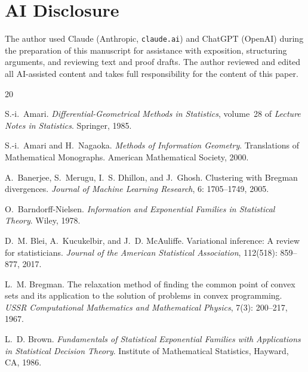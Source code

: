 \documentclass[11pt, a4paper, 
onecolumn, 
showabstract]{naverlabseurope-onecol-flex}
\theoremstyle{definition}
\theoremstyle{remark}
\begin{document}
\section*{AI Disclosure}

The author used Claude (Anthropic, \texttt{claude.ai}) and ChatGPT (OpenAI) during the preparation of this manuscript for assistance with exposition, structuring arguments, and reviewing text and proof drafts. The author reviewed and edited all AI-assisted content and takes full responsibility for the content of this paper.


\begin{thebibliography}{20}

S.-i.~Amari.
\emph{Differential-Geometrical Methods in Statistics}, volume~28 of \emph{Lecture Notes in Statistics}.
Springer, 1985.

S.-i.~Amari and H.~Nagaoka.
\emph{Methods of Information Geometry}.
Translations of Mathematical Monographs. American Mathematical Society, 2000.

A.~Banerjee, S.~Merugu, I.~S. Dhillon, and J.~Ghosh.
Clustering with {B}regman divergences.
\emph{Journal of Machine Learning Research}, 6: 1705--1749, 2005.

O.~Barndorff-Nielsen.
\emph{Information and Exponential Families in Statistical Theory}.
Wiley, 1978.

D.~M. Blei, A.~Kucukelbir, and J.~D. McAuliffe.
Variational inference: A review for statisticians.
\emph{Journal of the American Statistical Association}, 112(518): 859--877, 2017.

L.~M. Bregman.
The relaxation method of finding the common point of convex sets and its application to the solution of problems in convex programming.
\emph{USSR Computational Mathematics and Mathematical Physics}, 7(3): 200--217, 1967.

L.~D. Brown.
\emph{Fundamentals of Statistical Exponential Families with Applications in Statistical Decision Theory}.
Institute of Mathematical Statistics, Hayward, CA, 1986.


\end{thebibliography}
\end{document}
